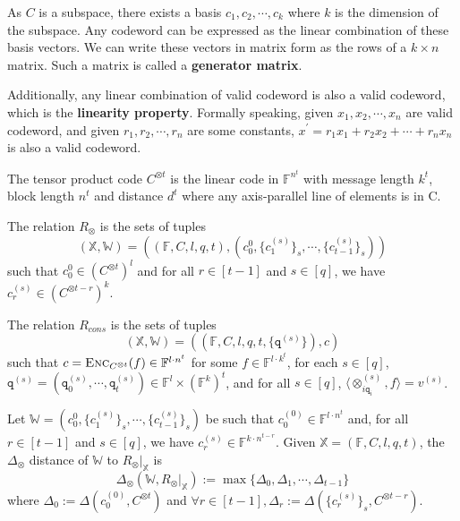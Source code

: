 As $C$ is a subspace, there exists a basis $c_1, c_2, \cdots, c_k$ where $k$ is the dimension of the subspace. Any codeword can be expressed as the linear combination of these basis vectors. We can write these vectors in matrix form as the rows of a $k \times n$ matrix. Such a matrix is called a \textbf{generator matrix}.

Additionally, any linear combination of valid codeword is also a valid codeword, which is the \textbf{linearity property}. Formally speaking, given $x_1, x_2, \cdots, x_n$ are valid codeword, and given $r_1, r_2, \cdots, r_n$ are some constants, $x^\prime = r_1 x_1 + r_2 x_2 + \cdots + r_n x_n$ is also a valid codeword.

\begin{definition}
The tensor product code $C^{\otimes t}$ is the linear code in $\mathbb{F}^{n^t}$ with message length $k^t$, block length $n^t$ and distance $d^t$ where any axis-parallel line of elements is in C.
\end{definition}

\begin{definition}
The relation $R_\otimes$ is the sets of tuples
$$
    (\mathbb{X}, \mathbb{W}) = ((\mathbb{F}, C, l, q, t), (c_0^{0}, \{c_1^{(s)}\}_s, \cdots, \{c_{t-1}^{(s)}\}_s))
$$ 
such that $c_0^{0} \in (C^{\otimes t})^l$ and for all $r \in [t-1]$ and $s \in [q]$, we have $c_r^{(s)} \in (C^{\otimes t-r})^k$.
\end{definition}

\begin{definition}
The relation $R_{cons}$ is the sets of tuples
$$
    (\mathbb{X}, \mathbb{W}) = ((\mathbb{F}, C, l, q, t, \{\texttt{q}^{(s)}\}), c)
$$ 
such that $c = \textsc{Enc}_{C^{\otimes t}}(f) \in \mathbb{F}^{l\cdot n^t}$ for some $f \in \mathbb{F}^{l\cdot k^t}$, 
for each $s \in [q]$, $\texttt{q}^{(s)} = (\texttt{q}_0^{(s)}, \cdots, \texttt{q}_t^{(s)}) \in \mathbb{F}^{l} \times (\mathbb{F}^k)^t$, 
and for all $s \in [q]$, $\langle \otimes_{i\texttt{q}_i}^{(s)} , f \rangle = v^{(s)}$.

\end{definition}

\begin{definition}
Let $\mathbb{W} = (c_0^{0}, \{c_1^{(s)}\}_s, \cdots, \{c_{t-1}^{(s)}\}_s)$ be such that $c_0^{(0)} \in \mathbb{F}^{l \cdot n^t}$ and, for all $r \in [t-1]$ and $s \in [q]$, we have $c_r^{(s)} \in \mathbb{F}^{k \cdot n^{t-r}}$. Given $\mathbb{X} = (\mathbb{F}, C, l, q, t)$, the $\Delta_\otimes$ distance of $\mathbb{W}$ to $R_\otimes|_{\mathbb{X}}$ is
$$
    \Delta_\otimes(\mathbb{W}, R_\otimes|_{\mathbb{X}}) := \max \{\Delta_0, \Delta_1, \cdots, \Delta_{t-1}\}
$$
where $\Delta_0 := \Delta(c_0^{(0)}, C^{\otimes t})$ and $\forall r \in [t-1], \Delta_r := \Delta(\{c_r^{(s)}\}_s, C^{\otimes t-r})$.
\end{definition}